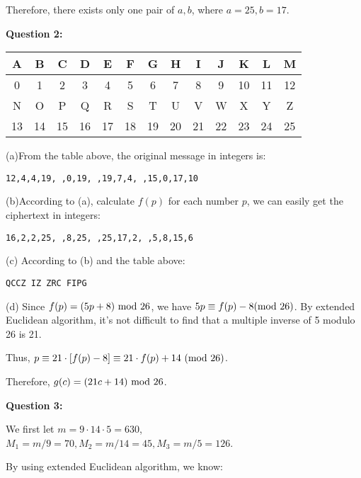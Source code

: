 \documentclass[a4paper,11pt]{article}
\begin{document}
\begin{spacing}{1.4}
    Therefore, there exists only one pair of $a,b$,
    where $a=25, b=17$.

    \vspace{20pt}

    \textbf{Question 2:}

    \begin{center}
        \begin{tabular}{c|c|c|c|c|c|c|c|c|c|c|c|c}
            \hline
            A&B&C&D&E&F&G&H&I&J&K&L&M\\\hline
            0&1&2&3&4&5&6&7&8&9&10&11&12\\
            \hline\hline
            N&O&P&Q&R&S&T&U&V&W&X&Y&Z\\\hline
            13&14&15&16&17&18&19&20&21&22&23&24&25\\\hline
        \end{tabular}
    \end{center}
    
    (a)From the table above, the original message in integers is:

    \hspace{2em} \texttt{12,4,4,19, ,0,19, ,19,7,4, ,15,0,17,10}

    (b)According to (a), calculate $f(p)$ for each number $p$,
    we can easily get the ciphertext in integers:
    
    \hspace{2em} \texttt{16,2,2,25, ,8,25, ,25,17,2, ,5,8,15,6}

    (c) According to (b) and the table above:

    \hspace{2em} \texttt{QCCZ IZ ZRC FIPG}

    (d) Since $f(p)=(5p+8)\ {\rm mod\ 26}$, we have
    $5p \equiv f(p)-8 {\rm (mod\ 26)}$.
    By extended Euclidean algorithm, it's not difficult to find
    that a multiple inverse of 5 modulo 26 is 21.

    Thus, $p\equiv 21\cdot [f(p)-8]\equiv 21\cdot f(p)+14\
    {\rm (mod\ 26)}$.

    Therefore, $g(c)=(21c+14)\ {\rm mod\ 26}$.


    \vspace{20pt}

    \textbf{Question 3:}

    We first let $m=9\cdot 14\cdot 5=630$,
    $M_1=m/9=70, M_2=m/14=45, M_3=m/5=126$.

    By using extended Euclidean algorithm, we know:


\end{spacing}
\end{document}
